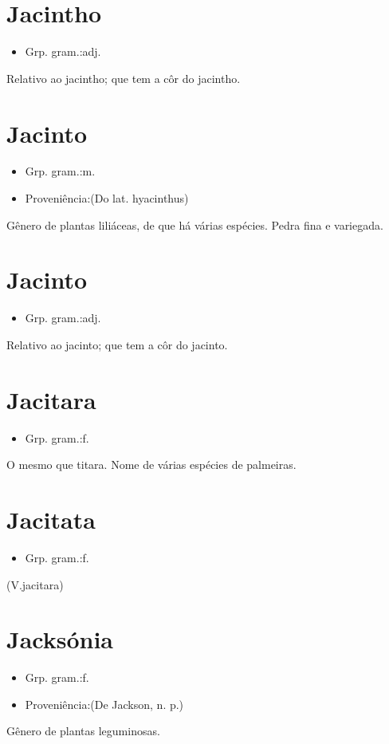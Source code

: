 \documentclass{article}
\begin{document}
\section{Jacintho}
\begin{itemize}
\item {Grp. gram.:adj.}
\end{itemize}
Relativo ao jacintho; que tem a côr do jacintho.
\section{Jacinto}
\begin{itemize}
\item {Grp. gram.:m.}
\end{itemize}
\begin{itemize}
\item {Proveniência:(Do lat. \textunderscore hyacinthus\textunderscore )}
\end{itemize}
Gênero de plantas liliáceas, de que há várias espécies.
Pedra fina e variegada.
\section{Jacinto}
\begin{itemize}
\item {Grp. gram.:adj.}
\end{itemize}
Relativo ao jacinto; que tem a côr do jacinto.
\section{Jacitara}
\begin{itemize}
\item {Grp. gram.:f.}
\end{itemize}
O mesmo que \textunderscore titara\textunderscore .
Nome de várias espécies de palmeiras.
\section{Jacitata}
\begin{itemize}
\item {Grp. gram.:f.}
\end{itemize}
(V.jacitara)
\section{Jacksónia}
\begin{itemize}
\item {Grp. gram.:f.}
\end{itemize}
\begin{itemize}
\item {Proveniência:(De \textunderscore Jackson\textunderscore , n. p.)}
\end{itemize}
Gênero de plantas leguminosas.
\end{document}
